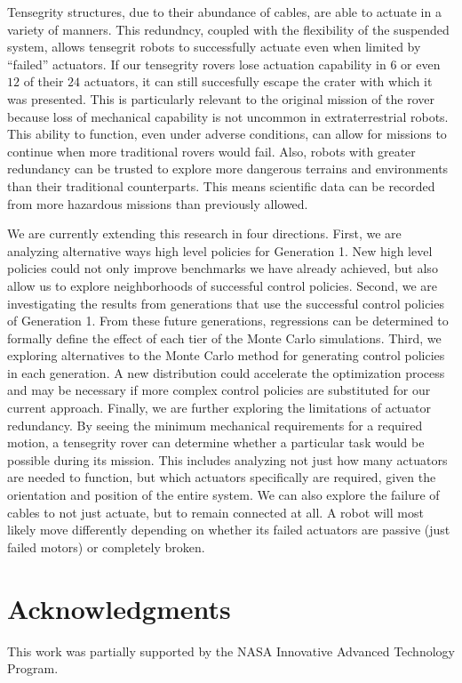 \documentclass{llncs}
\begin{document}
Tensegrity structures, due to their abundance of cables, are able to actuate in a variety of manners.
This redundncy, coupled with the flexibility of the suspended system, allows tensegrit robots to successfully actuate even when limited by ``failed'' actuators.
If our tensegrity rovers lose actuation capability in $6$ or even $12$ of their $24$ actuators, it can still succesfully escape the crater with which it was presented.
This is particularly relevant to the original mission of the rover because loss of mechanical capability is not uncommon in extraterrestrial robots.
This ability to function, even under adverse conditions, can allow for missions to continue when more traditional rovers would fail.
Also, robots with greater redundancy can be trusted to explore more dangerous terrains and environments than their traditional counterparts.
This means scientific data can be recorded from more hazardous missions than previously allowed.

We are currently extending this research in four directions.
First, we are analyzing alternative ways high level policies for Generation 1. 
New high level policies could not only improve benchmarks we have already achieved, but also allow us to explore neighborhoods of successful control policies.
Second, we are investigating the results from generations that use the successful control policies of Generation 1. 
From these future generations, regressions can be determined to formally define the effect of each tier of the Monte Carlo simulations.
Third, we exploring alternatives to the Monte Carlo method for generating control policies in each generation.
A new distribution could accelerate the optimization process and may be necessary if more complex control policies are substituted for our current approach.
Finally, we are further exploring the limitations of actuator redundancy.
By seeing the minimum mechanical requirements for a required motion, a tensegrity rover can determine whether a particular task would be possible during its mission.
This includes analyzing not just how many actuators are needed to function, but which actuators specifically are required, given the orientation and position of the entire system.
We can also explore the failure of cables to not just actuate, but to remain connected at all.
A robot will most likely move differently depending on whether its failed actuators are passive (just failed motors) or completely broken.

\section{Acknowledgments}
This work was partially supported by the NASA Innovative Advanced Technology Program.



\end{document}
